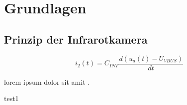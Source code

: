 \clearpage
{}
\section{Grundlagen}
\label{Grundlagen}
\vspace{-2mm}
\subsection{Prinzip der Infrarotkamera}

\begin{equation}
i_{2}(t) = C_{INT}\frac{d(u_{a}(t) - U_{V\!BUS})}{dt}
\label{eq:formulai2}
\end{equation}

lorem \cite{puhani2020statistik} ipsum \cite{budziergerlach1} dolor \cite{DAC121Sdatasheet} sit \cite{curvefitting} amit \cite{tissot2}.

test1